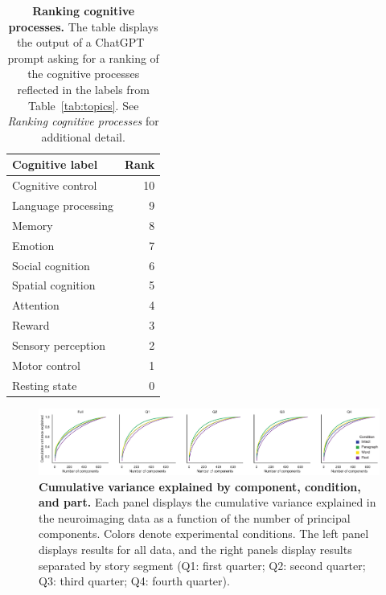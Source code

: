 \documentclass[english]{article}
\begin{document}
\newpage

\begin{table}[t]
\begin{center}
\begin{tabular}{lr}
  \toprule
  Cognitive label &  Rank \\
  \midrule
  Cognitive control   &    10 \\
  Language processing &     9 \\
  Memory              &     8 \\
  Emotion             &     7 \\
  Social cognition    &     6 \\
  Spatial cognition   &     5 \\
  Attention           &     4 \\
  Reward              &     3 \\
  Sensory perception  &     2 \\
  Motor control       &     1 \\
  Resting state       &     0 \\
  \bottomrule
\end{tabular}

\caption{\textbf{Ranking cognitive processes.} The table displays the output of
a ChatGPT~\citep{ChatGPT} prompt asking for a ranking of the cognitive
processes reflected in the labels from Table~\ref{tab:topics}. See \textit{Ranking cognitive
processes} for additional detail.}
\label{tab:topic-tags}

\end{center}
\end{table}
  
\newpage

\begin{figure}[t]
  \centering
  \includegraphics[width=\textwidth]{figs/variance_explained}

\caption{\textbf{Cumulative variance explained by component, condition, and part.} 
Each panel displays the cumulative variance explained in the neuroimaging data as a function of the number of principal components.
Colors denote experimental conditions.  The left panel displays results for all data, and the right panels display results separated
by story segment (Q1: first quarter; Q2: second quarter; Q3: third quarter; Q4: fourth quarter).}

\label{fig:var-explained}
\end{figure}
\end{document}
